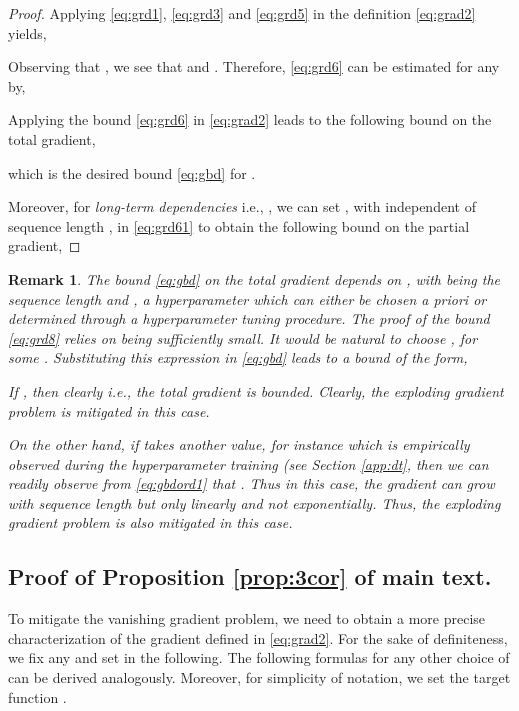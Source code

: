 \documentclass{article} \usepackage{iclr2022_conference,times}
\newtheorem{remark}[theorem]{Remark}
\begin{document}
\begin{proof}
Applying \eqref{eq:grd1}, \eqref{eq:grd3} and \eqref{eq:grd5} in the definition \eqref{eq:grad2} yields,

Observing that , we see that  and . Therefore, \eqref{eq:grd6} can be estimated for any  by, 


Applying the bound \eqref{eq:grd6} in \eqref{eq:grad2} leads to the following bound on the total gradient,

which is the desired bound \eqref{eq:gbd} for .



Moreover, for \emph{long-term dependencies} i.e., , we can set , with  independent of sequence length , in \eqref{eq:grd61} to obtain the following bound on the partial gradient, 

\end{proof}
\begin{remark}
\label{rem:gbd}
The bound \eqref{eq:gbd} on the total gradient depends on , with  being the sequence length and , a hyperparameter which can either be chosen a priori or determined through a hyperparameter tuning procedure. The proof of the bound \eqref{eq:grd8} relies on  being sufficiently small. It would be natural to choose , for some . Substituting this expression in \eqref{eq:gbd} leads to a bound of the form, 


If , then clearly  i.e., the total gradient is bounded. Clearly, the exploding gradient problem is mitigated in this case.

On the other hand, if  takes another value, for instance  which is empirically observed during the hyperparameter training (see Section \ref{app:dt}, then we can readily observe from \eqref{eq:gbdord1} that . Thus in this case, the gradient can grow with sequence length  but only linearly and not exponentially. Thus, the exploding gradient problem is also mitigated in this case. 

\end{remark}
\subsection{Proof of Proposition \ref{prop:3cor} of main text.}
\label{app:hsglb}
To mitigate the vanishing gradient problem, we need to obtain a more precise characterization of the gradient  defined in \eqref{eq:grad2}. For the sake of definiteness, we fix any  and set  in the following. The following formulas for any other choice of  can be derived analogously. Moreover, for simplicity of notation, we set the target function . 
\end{document}

